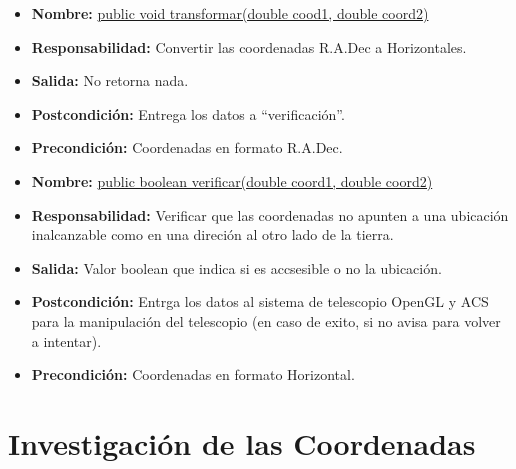 \documentclass[letterpaper,spanish,10pt]{article}
\begin{document}
\begin{itemize}
\item \textbf{Nombre:} \url{public void transformar(double cood1, double coord2)}
\item \textbf{Responsabilidad:} Convertir las coordenadas R.A.Dec a Horizontales.
\item \textbf{Salida:} No retorna nada.
\item \textbf{Postcondici\'on:} Entrega los datos a ``verificaci\'on''.
\item \textbf{Precondici\'on:} Coordenadas en formato R.A.Dec.
\end{itemize}

\begin{itemize}
\item \textbf{Nombre:} \url{public boolean verificar(double coord1, double coord2)}
\item \textbf{Responsabilidad:} Verificar que las coordenadas no apunten a una ubicaci\'on inalcanzable como en una direci\'on al otro lado de la tierra.
\item \textbf{Salida:} Valor boolean que indica si es accsesible o no la ubicaci\'on.
\item \textbf{Postcondici\'on:} Entrga los datos al sistema de telescopio OpenGL y ACS para la manipulaci\'on del telescopio (en caso de exito, si no avisa para volver a intentar).
\item \textbf{Precondici\'on:} Coordenadas en formato Horizontal.
\end{itemize}


\section{Investigaci\'on de las Coordenadas}
\end{document}
